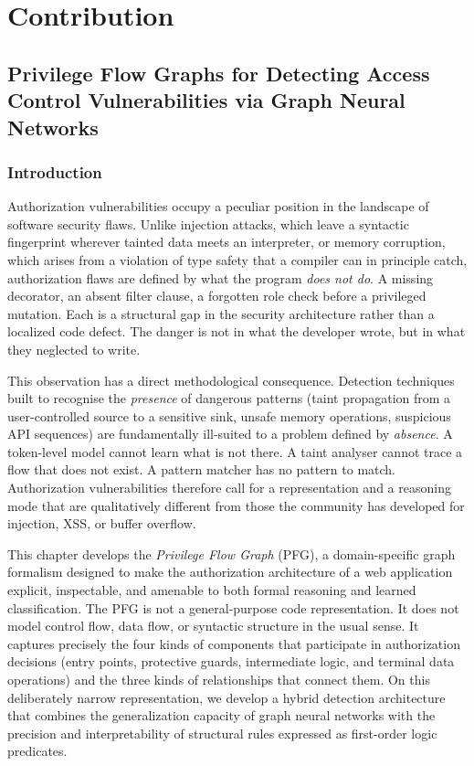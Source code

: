 \part{Contribution}

\chapter{Privilege Flow Graphs for Detecting Access Control 
Vulnerabilities via Graph Neural Networks}
\label{ch:detection}

\section{Introduction}
\label{det:intro}

Authorization vulnerabilities occupy a peculiar position in the landscape of
software security flaws. Unlike injection attacks, which leave a syntactic
fingerprint wherever tainted data meets an interpreter, or memory corruption,
which arises from a violation of type safety that a compiler can in principle
catch, authorization flaws are defined by what the program \emph{does not
do}. A missing decorator, an absent filter clause, a forgotten role check
before a privileged mutation. Each is a structural gap in the security
architecture rather than a localized code defect. The danger is not in what
the developer wrote, but in what they neglected to write.

This observation has a direct methodological consequence. Detection
techniques built to recognise the \emph{presence} of dangerous patterns
(taint propagation from a user-controlled source to a sensitive sink,
unsafe memory operations, suspicious API sequences) are fundamentally
ill-suited to a problem defined by \emph{absence}. A token-level model
cannot learn what is not there. A taint analyser cannot trace a flow that
does not exist. A pattern matcher has no pattern to match. Authorization
vulnerabilities therefore call for a representation and a reasoning mode
that are qualitatively different from those the community has developed for
injection, XSS, or buffer overflow.

This chapter develops the \emph{Privilege Flow Graph} (PFG), a domain-specific
graph formalism designed to make the authorization architecture of a web
application explicit, inspectable, and amenable to both formal reasoning and
learned classification. The PFG is not a general-purpose code
representation. It does not model control flow, data flow, or syntactic
structure in the usual sense. It captures precisely the four kinds of
components that participate in authorization decisions (entry points,
protective guards, intermediate logic, and terminal data operations) and the
three kinds of relationships that connect them. On this deliberately narrow
representation, we develop a hybrid detection architecture that combines the
generalization capacity of graph neural networks with the precision and
interpretability of structural rules expressed as first-order logic
predicates.


